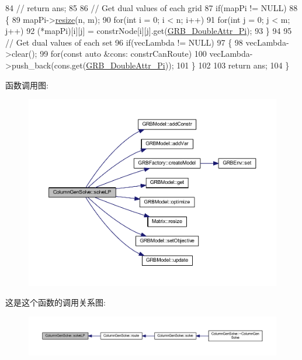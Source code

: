 \begin{DoxyCode}
84         \textcolor{comment}{// return ans;}
85     
86     \textcolor{comment}{// Get dual values of each grid}
87     \textcolor{keywordflow}{if}(mapPi != NULL)
88     \{
89         mapPi->\hyperlink{classMatrix_a15ce96c8af4c7a982c2c10b96f29cea1}{resize}(n, m);
90         \textcolor{keywordflow}{for}(\textcolor{keywordtype}{int} i = 0; i < n; i++)
91             \textcolor{keywordflow}{for}(\textcolor{keywordtype}{int} j = 0; j < m; j++)
92                 (*mapPi)[i][j] = constrNode[i][j].get(\hyperlink{gurobi__c_09_09_8h_a2f43cc28447ce1778973a1f7961e8180a9a7c190c12f277ba010fc1039b9540fd}{GRB\_DoubleAttr\_Pi});
93     \}
94     
95     \textcolor{comment}{// Get dual values of each set}
96     \textcolor{keywordflow}{if}(vecLambda != NULL)
97     \{
98         vecLambda->clear();
99         \textcolor{keywordflow}{for}(\textcolor{keyword}{const} \textcolor{keyword}{auto} &cons: constrCanRoute)
100             vecLambda->push\_back(cons.get(\hyperlink{gurobi__c_09_09_8h_a2f43cc28447ce1778973a1f7961e8180a9a7c190c12f277ba010fc1039b9540fd}{GRB\_DoubleAttr\_Pi}));
101     \}
102     
103     \textcolor{keywordflow}{return} ans;
104 \}
\end{DoxyCode}


函数调用图\+:
\nopagebreak
\begin{figure}[H]
\begin{center}
\leavevmode
\includegraphics[width=350pt]{classColumnGenSolve_aadb23efa531a3eb68651ba11f4d36c81_cgraph}
\end{center}
\end{figure}




这是这个函数的调用关系图\+:
\nopagebreak
\begin{figure}[H]
\begin{center}
\leavevmode
\includegraphics[width=350pt]{classColumnGenSolve_aadb23efa531a3eb68651ba11f4d36c81_icgraph}
\end{center}
\end{figure}



